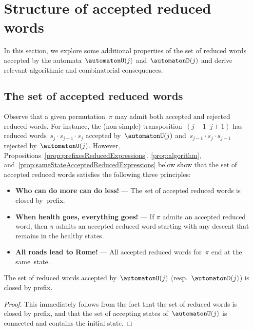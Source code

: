 \section{Structure of accepted reduced words}\label{sec:algorithmicCombinatorialConsequences}

In this section, we explore some additional properties of the set of reduced words accepted by the automata~$\automatonU(j)$ and~$\automatonD(j)$ and derive relevant algorithmic and combinatorial consequences.

\subsection{The set of accepted reduced words}\label{subsec:principles}

Observe that a given permutation~$\pi$ may admit both accepted and rejected reduced words.
For instance, the (non-simple) transposition~${(j-1 \;\; j+1)}$ has reduced words~$s_j \cdot s_{j-1} \cdot s_j$ accepted by~$\automatonU(j)$ and~$s_{j-1} \cdot s_j \cdot s_{j-1}$ rejected by~$\automatonU(j)$.
However, Propositions~\ref{prop:prefixesReducedExpressions}, \ref{prop:algorithm}, and~\ref{prop:sameStateAcceptedReducedExpressions} below show that the set of accepted reduced words satisfies the following three principles:
\begin{itemize}
	\item \textbf{Who can do more can do less!} --- The set of accepted reduced words is closed by~prefix.
	\item \textbf{When health goes, everything goes!} --- If $\pi$ admits an accepted reduced word, then $\pi$ admits an accepted reduced word starting with any descent that remains in the healthy states.
	\item \textbf{All roads lead to Rome!} --- All accepted reduced words for~$\pi$ end at the same~state.
\end{itemize}

\begin{prop}\label{prop:prefixesReducedExpressions}
The set of reduced words accepted by~$\automatonU(j)$ (resp.~$\automatonD(j)$) is closed by prefix.
\end{prop}

\begin{proof}
This immediately follows from the fact that the set of reduced words is closed by prefix, and that the set of accepting states of~$\automatonU(j)$ is connected and contains the initial state.
\end{proof}

